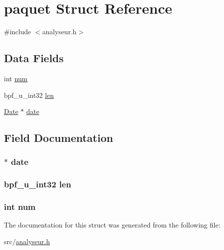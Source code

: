 \hypertarget{structpaquet}{}\section{paquet Struct Reference}
\label{structpaquet}


{\ttfamily \#include $<$analyseur.\+h$>$}

\subsection*{Data Fields}
\begin{DoxyCompactItemize}
\item 
int \hyperlink{structpaquet_a86cf672daa4e0ad11ad10efc894d19c8}{num}
\item 
bpf\+\_\+u\+\_\+int32 \hyperlink{structpaquet_a728f264db4f5cc304742565a2bcdbeea}{len}
\item 
\hyperlink{analyseur_8h_a8e361667cc667d5a11fd84869a8de384}{Date} $\ast$ \hyperlink{structpaquet_a73fc78564c9badbcea68f2f2331c74db}{date}
\end{DoxyCompactItemize}


\subsection{Field Documentation}
\subsubsection[{\texorpdfstring{date}{date}}]{$\ast$ date}\hypertarget{structpaquet_a73fc78564c9badbcea68f2f2331c74db}{}\label{structpaquet_a73fc78564c9badbcea68f2f2331c74db}
\subsubsection[{\texorpdfstring{len}{len}}]{\setlength{\rightskip}{0pt plus 5cm}bpf\+\_\+u\+\_\+int32 len}\hypertarget{structpaquet_a728f264db4f5cc304742565a2bcdbeea}{}\label{structpaquet_a728f264db4f5cc304742565a2bcdbeea}
\subsubsection[{\texorpdfstring{num}{num}}]{\setlength{\rightskip}{0pt plus 5cm}int num}\hypertarget{structpaquet_a86cf672daa4e0ad11ad10efc894d19c8}{}\label{structpaquet_a86cf672daa4e0ad11ad10efc894d19c8}


The documentation for this struct was generated from the following file\+:\begin{DoxyCompactItemize}
\item 
src/\hyperlink{analyseur_8h}{analyseur.\+h}\end{DoxyCompactItemize}
